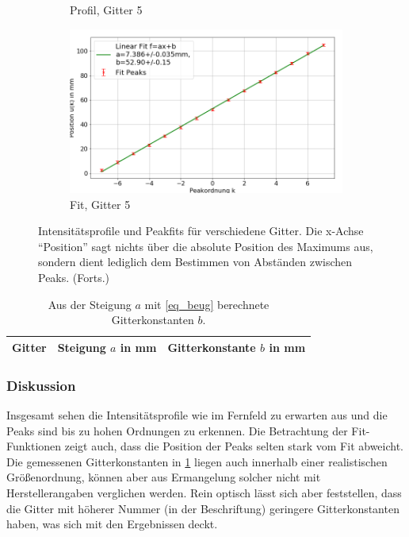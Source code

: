 \documentclass[
	a4paper,
	12pt,
	pagesize,
	ngerman
]{scrartcl}
\begin{document}
\begin{figure}[H]
\begin{subfigure}[b]{0.475\textwidth}
            \caption%
            {Profil, Gitter 5}
            \label{fig_2_profil_g5}
        \end{subfigure}
        \hfill
        \begin{subfigure}[b]{0.475\textwidth}
            \centering
            \includegraphics[width=\textwidth]{img/2/2_gitter_g5_fit}
            \caption[]%
            {Fit, Gitter 5}
            \label{fig_2_fit_g5}
        \end{subfigure}
        \caption%
        {
				Intensitätsprofile und Peakfits für verschiedene Gitter.
				Die x-Achse \enquote{Position} sagt nichts über die absolute Position des Maximums aus, sondern dient lediglich dem Bestimmen von Abständen zwischen Peaks. (Forts.)
				}
        \label{fig_2_mix_2}
    \end{figure}

\begin{table}[H]
		\centering
		\begin{tabular}{ c | c | c }
			 Gitter & Steigung $a$ in \si{mm} & Gitterkonstante $b$ in \si{mm} \\ \hline
			 
		\end{tabular}
		\caption{
		Aus der Steigung $a$ mit \cref{eq_beug} berechnete Gitterkonstanten $b$.
		}
		\label{tb_2_beug}
\end{table}
	\subsubsection*{Diskussion}
	Insgesamt sehen die Intensitätsprofile wie im Fernfeld zu erwarten aus und die Peaks sind bis zu hohen Ordnungen zu erkennen.
	Die Betrachtung der Fit-Funktionen zeigt auch, dass die Position der Peaks selten stark vom Fit abweicht.
	Die gemessenen Gitterkonstanten in \cref{tb_2_beug} liegen auch innerhalb einer realistischen Größenordnung, können aber aus Ermangelung solcher nicht mit Herstellerangaben verglichen werden.
	Rein optisch lässt sich aber feststellen, dass die Gitter mit höherer Nummer (in der Beschriftung) geringere Gitterkonstanten haben, was sich mit den Ergebnissen deckt.
\end{document}
